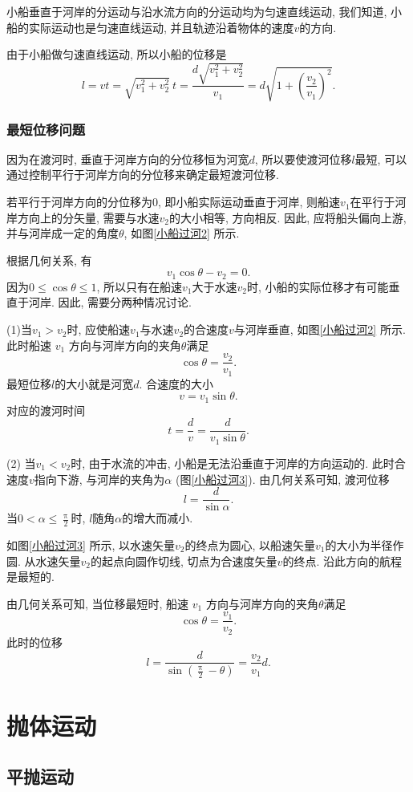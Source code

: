 \documentclass[11pt,a4paper]{ctexbook}
\begin{document}
小船垂直于河岸的分运动与沿水流方向的分运动均为匀速直线运动, 我们知道, 小船的实际运动也是匀速直线运动,
并且轨迹沿着物体的速度$v$的方向.

由于小船做匀速直线运动, 所以小船的位移是
$$l=vt=\sqrt{v_1^2 + v_2^2}\ t = \frac{d\sqrt{v_1^2 + v_2^2}}{v_1} = d\sqrt{1 + \left(\frac{v_2}{v_1}\right)^2}.$$

\subsection*{最短位移问题}

因为在渡河时, 垂直于河岸方向的分位移恒为河宽$d$, 所以要使渡河位移$l$最短, 可以通过控制平行于河岸方向的分位移来确定最短渡河位移.

若平行于河岸方向的分位移为0, 即小船实际运动垂直于河岸, 则船速$v_1$在平行于河岸方向上的分矢量,
需要与水速$v_2$的大小相等, 方向相反.
因此, 应将船头偏向上游, 并与河岸成一定的角度$\theta$, 如图\ref{小船过河2} 所示.

根据几何关系, 有 $$v_1 \cos{\theta} - v_2 = 0.$$
因为$0\leqslant\cos \theta\leqslant 1$, 所以只有在船速$v_1$大于水速$v_2$时,
小船的实际位移才有可能垂直于河岸. 因此, 需要分两种情况讨论.

(1)当$v_1 > v_2$时, 应使船速$v_1$与水速$v_2$的合速度$v$与河岸垂直, 如图\ref{小船过河2} 所示. 此时船速 $v_1$
方向与河岸方向的夹角$\theta$满足$$\cos{\theta} = \frac{v_2}{v_1}.$$最短位移$l$的大小就是河宽$d$.
合速度的大小$$v = v_1 \sin{\theta}.$$
对应的渡河时间$$t = \frac{d}{v} = \frac{d}{v_1 \sin{\theta}}.$$

(2) 当$v_1 < v_2$时, 由于水流的冲击, 小船是无法沿垂直于河岸的方向运动的. 此时合速度$v$指向下游,
与河岸的夹角为$\alpha$ (图\ref{小船过河3}). 由几何关系可知, 渡河位移$$l = \frac{d}{\sin {\alpha}}.$$
当$0<\alpha\leqslant \displaystyle\frac{\uppi}{2}$时, $l$随角$\alpha$的增大而减小.

如图\ref{小船过河3} 所示, 以水速矢量$v_2$的终点为圆心, 以船速矢量$v_1$的大小为半径作圆. 从水速矢量$v_2$的起点向圆作切线,
切点为合速度矢量$v$的终点. 沿此方向的航程是最短的.

由几何关系可知, 当位移最短时, 船速 $v_1$ 方向与河岸方向的夹角$\theta$满足 $$\cos{\theta} = \frac{v_1}{v_2}.$$
此时的位移 $$l = \frac{d}{\sin \left (\displaystyle\frac{\uppi}{2}-\theta \right )} = \frac{v_2}{v_1} d.$$

\chapter{抛体运动}
\section{平抛运动}
\end{document}
